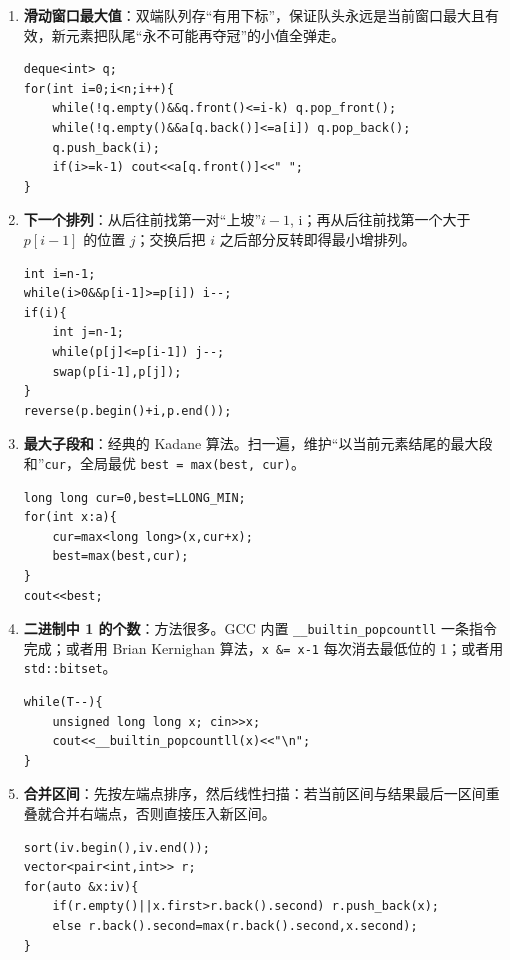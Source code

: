 \documentclass{article}
\begin{document}
\begin{enumerate}[label=\textbf{M\arabic*.}]
  \item \textbf{滑动窗口最大值}：双端队列存“有用下标”，保证队头永远是当前窗口最大且有效，新元素把队尾“永不可能再夺冠”的小值全弹走。
\begin{lstlisting}
deque<int> q;
for(int i=0;i<n;i++){
    while(!q.empty()&&q.front()<=i-k) q.pop_front();
    while(!q.empty()&&a[q.back()]<=a[i]) q.pop_back();
    q.push_back(i);
    if(i>=k-1) cout<<a[q.front()]<<" ";
}
\end{lstlisting}

  \item \textbf{下一个排列}：从后往前找第一对“上坡”$i-1$, i；再从后往前找第一个大于 $p[i-1]$ 的位置 $j$；交换后把 $i$ 之后部分反转即得最小增排列。
\begin{lstlisting}
int i=n-1;
while(i>0&&p[i-1]>=p[i]) i--;
if(i){
    int j=n-1;
    while(p[j]<=p[i-1]) j--;
    swap(p[i-1],p[j]);
}
reverse(p.begin()+i,p.end());
\end{lstlisting}

  \item \textbf{最大子段和}：经典的 Kadane 算法。扫一遍，维护“以当前元素结尾的最大段和”\texttt{cur}，全局最优 \texttt{best = max(best, cur)}。
\begin{lstlisting}
long long cur=0,best=LLONG_MIN;
for(int x:a){
    cur=max<long long>(x,cur+x);
    best=max(best,cur);
}
cout<<best;
\end{lstlisting}

  \item \textbf{二进制中 1 的个数}：方法很多。GCC 内置 \texttt{\_\_builtin\_popcountll} 一条指令完成；或者用 Brian Kernighan 算法，\texttt{x \&= x-1} 每次消去最低位的 1；或者用\texttt{std::bitset}。
\begin{lstlisting}
while(T--){
    unsigned long long x; cin>>x;
    cout<<__builtin_popcountll(x)<<"\n";
}
\end{lstlisting}

  \item \textbf{合并区间}：先按左端点排序，然后线性扫描：若当前区间与结果最后一区间重叠就合并右端点，否则直接压入新区间。
\begin{lstlisting}
sort(iv.begin(),iv.end());
vector<pair<int,int>> r;
for(auto &x:iv){
    if(r.empty()||x.first>r.back().second) r.push_back(x);
    else r.back().second=max(r.back().second,x.second);
}
\end{lstlisting}
\end{enumerate}
\end{document}
